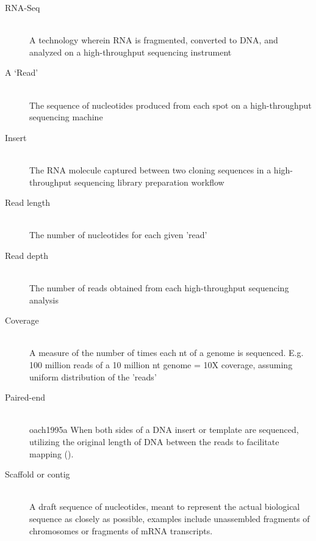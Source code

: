 \documentclass[12pt, letter, oneside]{Thesis} %
\begin{document}
\clearpage %
	\listDefinitions

\begin{description}
  \item[RNA-Seq] \hfill \\
  A technology wherein RNA is fragmented, converted to DNA, and analyzed on a high-throughput sequencing instrument
  \item[A ‘Read’] \hfill \\
  The sequence of nucleotides produced from each spot on a high-throughput sequencing machine
  \item[Insert] \hfill \\
  The RNA molecule captured between two cloning sequences in a high-throughput sequencing library preparation workflow
    \item[Read length] \hfill \\
  The number of nucleotides for each given 'read'
    \item[Read depth] \hfill \\
  The number of reads obtained from each high-throughput sequencing analysis
    \item[Coverage] \hfill \\
  A measure of the number of times each nt of a genome is sequenced. E.g. 100 million reads of a 10 million nt genome = 10X coverage, assuming uniform distribution of the 'reads'
    \item[Paired-end] \hfill \\oach1995a
  When both sides of a DNA insert or template are sequenced, utilizing the original length of DNA between the reads to facilitate mapping (\cite{Roach1995}).
      \item[Scaffold or contig] \hfill \\
  A draft sequence of nucleotides, meant to represent the actual biological sequence as closely as possible, examples include unassembled fragments of chromosomes or fragments of mRNA transcripts.
\end{description}
\clearpage %
\end{document}
